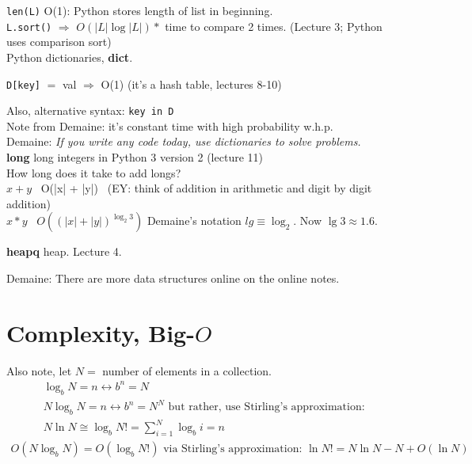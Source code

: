 \documentclass[10pt]{amsart}
\begin{document}
\verb|len(L)| O(1): Python stores length of list in beginning. \\

\verb|L.sort()| $\Longrightarrow$ $O(|L| \log{ |L|}) * $ time to compare 2 times.  (Lecture 3; Python uses comparison sort) \\

Python dictionaries, \textbf{dict}.

\verb|D[key]| $=$ val $\Longrightarrow$ O(1) (it's a hash table, lectures 8-10)

Also, alternative syntax: \verb|key in D| \\

Note from Demaine: it's constant time with high probability w.h.p. \\

Demaine: \emph{If you write any code today, use dictionaries to solve problems.} \\

\textbf{long} long integers in Python 3 version 2 (lecture 11) \\

How long does it take to add longs? \\
$x+ y$ \quad \, O(|x| + |y|) \quad \, (EY: think of addition in arithmetic and digit by digit addition)  \\

$x * y$ \quad \, $O((|x| + |y|)^{\log_2{3}})$  Demaine's notation $lg \equiv \log_2$. Now $\lg{3} \approx 1.6$.

\textbf{heapq} heap. Lecture 4.

Demaine: There are more data structures online on the online notes.


\section{Complexity, Big-$O$}

Also note, let $N = $ number of elements in a collection.
\[
\begin{gathered}
\log_b{N} = n \leftrightarrow b^n = N \\ 
N \log_b{N} = n \leftrightarrow b^n = N^N \text{ but rather, use Stirling's approximation: } \\
N \ln N \cong \log_b{N!} = \sum_{i=1}^N \log_b{i} = n  
\end{gathered}
\]
\[
\begin{gathered}
O(N\log_b{N}) = O(\log_b{N!}) \text{ via Stirling's approximation: } \ln{N!} = N\ln{N} - N + O(\ln{N})
\end{gathered}
\]
\end{document}
